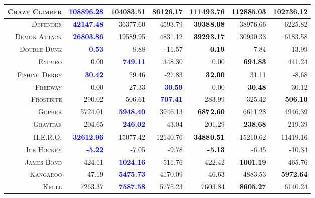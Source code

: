 \documentclass{article}
\begin{document}
{\begin{table}
{\begin{tabular}{|r|r|r|r||r|r|r|}
\hline
\textsc{Crazy Climber} & \textbf{\textcolor{blue}{108896.28}} & 104083.51 & 86126.17  & 111493.76 & \textbf{\textcolor{black}{112885.03}} & 102736.12  \\
\hline
\textsc{Defender} & \textbf{\textcolor{blue}{42147.48}} & 36377.60 & 4593.79  & \textbf{\textcolor{black}{39388.08}} & 38976.66 & 6225.82  \\
\hline
\textsc{Demon Attack} & \textbf{\textcolor{blue}{26803.86}} & 19589.95 & 4831.12  & \textbf{\textcolor{black}{39293.17}} & 30930.33 & 6183.58  \\
\hline
\textsc{Double Dunk} & \textbf{\textcolor{blue}{0.53}} & -8.88 & -11.57  & \textbf{\textcolor{black}{0.19}} & -7.84 & -13.99  \\
\hline
\textsc{Enduro} & 0.00 & \textbf{\textcolor{blue}{749.11}} & 348.30  & 0.00 & \textbf{\textcolor{black}{694.83}} & 441.24  \\
\hline
\textsc{Fishing Derby} & \textbf{\textcolor{blue}{30.42}} & 29.46 & -27.83  & \textbf{\textcolor{black}{32.00}} & 31.11 & -8.68  \\
\hline
\textsc{Freeway} & 0.00 & 27.33 & \textbf{\textcolor{blue}{30.59}}  & 0.00 & \textbf{\textcolor{black}{30.48}} & 30.12  \\
\hline
\textsc{Frostbite} & 290.02 & 506.61 & \textbf{\textcolor{blue}{707.41}}  & 283.99 & 325.42 & \textbf{\textcolor{black}{506.10}}  \\
\hline
\textsc{Gopher} & 5724.01 & \textbf{\textcolor{blue}{5948.40}} & 3946.13  & \textbf{\textcolor{black}{6872.60}} & 6611.28 & 4946.39  \\
\hline
\textsc{Gravitar} & 204.65 & \textbf{\textcolor{blue}{246.02}} & 43.04  & 201.29 & \textbf{\textcolor{black}{238.68}} & 219.39  \\
\hline
\textsc{H.E.R.O.} & \textbf{\textcolor{blue}{32612.96}} & 15077.42 & 12140.76  & \textbf{\textcolor{black}{34880.51}} & 15210.62 & 11419.16  \\
\hline
\textsc{Ice Hockey} & \textbf{\textcolor{blue}{-5.22}} & -7.05 & -9.78  & \textbf{\textcolor{black}{-5.13}} & -6.45 & -10.34  \\
\hline
\textsc{James Bond} & 424.11 & \textbf{\textcolor{blue}{1024.16}} & 511.76  & 422.42 & \textbf{\textcolor{black}{1001.19}} & 465.76  \\
\hline
\textsc{Kangaroo} & 47.19 & \textbf{\textcolor{blue}{5475.73}} & 4170.09  & 46.63 & 4883.53 & \textbf{\textcolor{black}{5972.64}}  \\
\hline
\textsc{Krull} & 7263.37 & \textbf{\textcolor{blue}{7587.58}} & 5775.23  & 7603.84 & \textbf{\textcolor{black}{8605.27}} & 6140.24  \\

\end{tabular}}
\end{table}}
\end{document}
